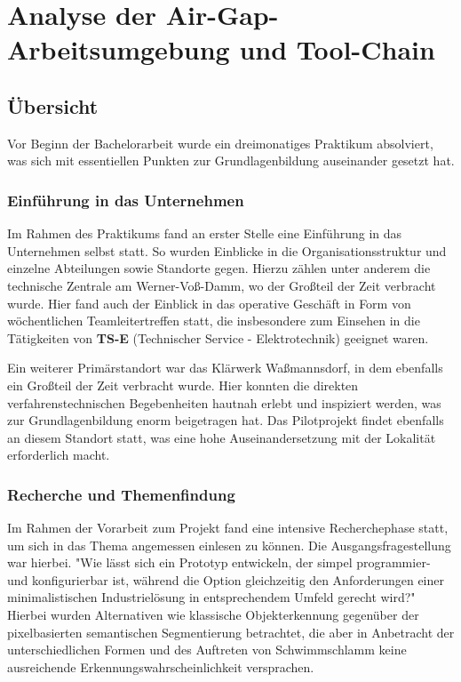 
\chapter{Analyse der Air-Gap-Arbeitsumgebung und Tool-Chain} \label{Vorarbeit}



\section{Übersicht}
Vor Beginn der Bachelorarbeit wurde ein dreimonatiges Praktikum absolviert, was sich mit essentiellen Punkten zur Grundlagenbildung auseinander gesetzt hat. 

\subsection{Einführung in das Unternehmen}
Im Rahmen des Praktikums fand an erster Stelle eine Einführung in das Unternehmen selbst statt. So wurden Einblicke in die Organisationsstruktur und einzelne Abteilungen sowie Standorte gegen. Hierzu zählen unter anderem die technische Zentrale am Werner-Voß-Damm, wo der Großteil der Zeit verbracht wurde. Hier fand auch der Einblick in das operative Geschäft in Form von wöchentlichen Teamleitertreffen statt, die insbesondere zum Einsehen in die Tätigkeiten von \textbf{TS-E} (Technischer Service - Elektrotechnik) geeignet waren. 

Ein weiterer Primärstandort war das Klärwerk Waßmannsdorf, in dem ebenfalls ein Großteil der Zeit verbracht wurde. Hier konnten die direkten verfahrenstechnischen Begebenheiten hautnah erlebt und inspiziert werden, was zur Grundlagenbildung enorm beigetragen hat. Das Pilotprojekt findet ebenfalls an diesem Standort statt, was eine hohe Auseinandersetzung mit der Lokalität erforderlich macht.  

\subsection{Recherche und Themenfindung}

Im Rahmen der Vorarbeit zum Projekt fand eine intensive Recherchephase statt, um sich in das Thema angemessen einlesen zu können. Die Ausgangsfragestellung war hierbei. "Wie lässt sich ein Prototyp entwickeln, der simpel programmier- und konfigurierbar ist, während die Option gleichzeitig den Anforderungen einer minimalistischen Industrielösung in entsprechendem Umfeld gerecht wird?"
Hierbei wurden Alternativen wie klassische Objekterkennung gegenüber der pixelbasierten semantischen Segmentierung betrachtet, die aber in Anbetracht der unterschiedlichen Formen und des Auftreten von Schwimmschlamm keine ausreichende Erkennungswahrscheinlichkeit versprachen. \\

